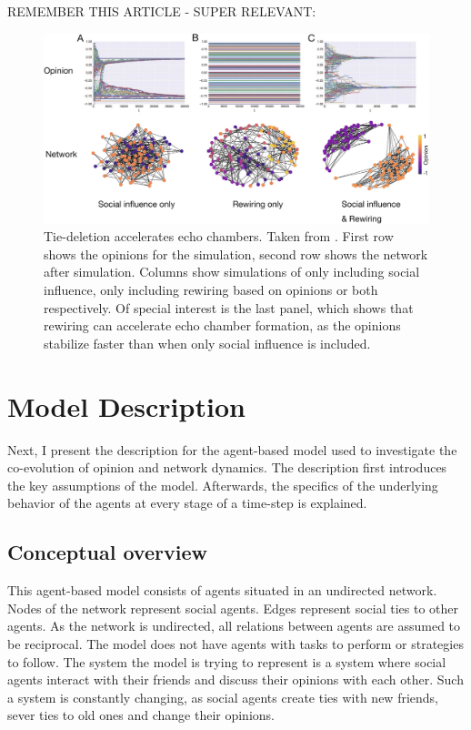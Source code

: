 \documentclass{article}
\begin{document}
REMEMBER THIS ARTICLE - SUPER RELEVANT: \cite{geschke2019triple}

\begin{figure}[H]
    \centering
    \includegraphics[width=.8\linewidth]{../plots/references/echo_chambers.png}
  \caption{Tie-deletion accelerates echo chambers. Taken from \protect\citeauthor{sasahara_social_2021} \protect\citeyear{sasahara_social_2021}. First row shows the opinions for the simulation, second row shows the network after simulation. Columns show simulations of only including social influence, only including rewiring based on opinions or both respectively. Of special interest is the last panel, which shows that rewiring can accelerate echo chamber formation, as the opinions stabilize faster than when only social influence is included.}
  \label{fig:echo_chambers}
\end{figure}

\section{Model Description}
Next, I present the description for the agent-based model used to investigate the co-evolution of opinion and network dynamics. 
The description first introduces the key assumptions of the model. Afterwards, the specifics of the underlying behavior of the agents at every stage of a time-step is explained. 
\subsection{Conceptual overview}
This agent-based model consists of agents situated in an undirected network. Nodes of the network represent social agents. Edges represent social ties to other agents. As the network is undirected, all relations between agents are assumed to be reciprocal.
The model does not have agents with tasks to perform or strategies to follow. The system the model is trying to represent is a system where social agents interact with their friends and discuss their opinions with each other. Such a system is constantly changing, as social agents create ties with new friends, sever ties to old ones and change their opinions. 
\end{document}
